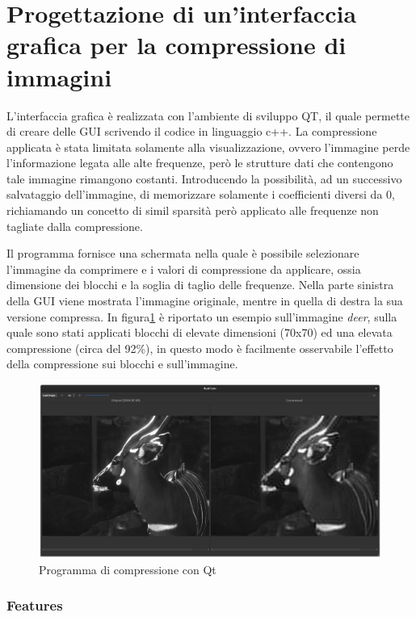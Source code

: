 \part{Progettazione di un'interfaccia grafica per la compressione di immagini}

L'interfaccia grafica è realizzata con l'ambiente di sviluppo QT\cite{qt}, il quale permette di creare delle GUI scrivendo il codice in linguaggio c++. La compressione applicata è stata limitata solamente alla visualizzazione, ovvero l'immagine perde l'informazione legata alle alte frequenze, però le strutture dati che contengono tale immagine rimangono costanti. Introducendo la possibilità, ad un successivo salvataggio dell'immagine, di memorizzare solamente i coefficienti diversi da 0, richiamando un concetto di simil sparsità però applicato alle frequenze non tagliate dalla compressione.

Il programma fornisce una schermata nella quale è possibile selezionare l'immagine da comprimere e i valori di compressione da applicare, ossia dimensione dei blocchi e la soglia di taglio delle frequenze. Nella parte sinistra della GUI viene mostrata l'immagine originale, mentre in quella di destra la sua versione compressa. In figura\ref{fig:deer} è riportato un esempio sull'immagine \textit{deer}, sulla quale sono stati applicati blocchi di elevate dimensioni (70x70) ed una elevata compressione (circa del 92\%), in questo modo è facilmente osservabile l'effetto della compressione sui blocchi e sull'immagine.

\begin{figure}[h]
	\centering
	\includegraphics[width=1\linewidth]{figures/qt_deer}
	\caption{Programma di compressione con Qt}
	\label{fig:deer}
\end{figure}

\section{Features}

